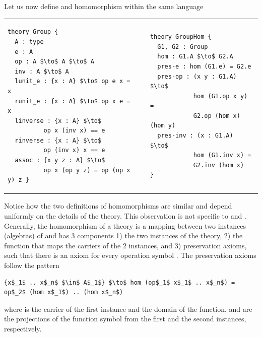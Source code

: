 Let us now define  and  homomorphism within the same language \\
\begin{tabular}[t]{p{6.3cm} p{1cm} p{6.3cm}}
\begin{lstlisting}[mathescape, basicstyle=\footnotesize]
theory Group {
  A : type 
  e : A
  op : A $\to$ A $\to$ A
  inv : A $\to$ A
  lunit_e : {x : A} $\to$ op e x = x
  runit_e : {x : A} $\to$ op x e = x
  linverse : {x : A} $\to$ 
          op x (inv x) == e
  rinverse : {x : A} $\to$ 
          op (inv x) x == e
  assoc : {x y z : A} $\to$ 
          op x (op y z) = op (op x y) z }
\end{lstlisting}
& &
\begin{lstlisting}[mathescape, basicstyle=\footnotesize]
theory GroupHom { 
  G1, G2 : Group 
  hom : G1.A $\to$ G2.A
  pres-e : hom (G1.e) = G2.e
  pres-op : (x y : G1.A) $\to$ 
            hom (G1.op x y) = 
            G2.op (hom x) (hom y)
  pres-inv : (x : G1.A) $\to$ 
            hom (G1.inv x) = 
            G2.inv (hom x)  }
\end{lstlisting}
\end{tabular}

Notice how the two definitions of homomorphisms are similar and depend uniformly on the details of the theory. This observation is not specific to  and . Generally, the homomorphism of a theory  is a mapping between two instances (algebras) of  and has $3$ components 1) the two instances of the theory, 2) the function  that maps the carriers of the $2$ instances, and 3) preservation axioms, such that there is an axiom  for every operation symbol . The preservation axioms follow the pattern
\begin{lstlisting}[mathescape]
{x$_1$ .. x$_n$ $\in$ A$_1$} $\to$ hom (op$_1$ x$_1$ .. x$_n$) = op$_2$ (hom x$_1$) .. (hom x$_n$)
\end{lstlisting}
where  is the carrier of the first instance and the domain of the  function.  and  are the projections of the function symbol  from the first and the second instances, respectively. 

